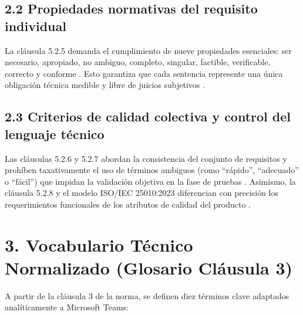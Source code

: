 \documentclass[11pt,a4paper]{article}
\begin{document}
	\subsection*{\textbf{2.2 Propiedades normativas del requisito individual}}
	La cláusula 5.2.5 demanda el cumplimiento de nueve propiedades esenciales: ser necesario, apropiado, no ambiguo, completo, singular, factible, verificable, correcto y conforme \cite{iso29148_2018}. Esto garantiza que cada sentencia represente una única obligación técnica medible y libre de juicios subjetivos \cite{swebok2024}.
	
	\subsection*{\textbf{2.3 Criterios de calidad colectiva y control del lenguaje técnico}}
	Las cláusulas 5.2.6 y 5.2.7 abordan la consistencia del conjunto de requisitos y prohíben taxativamente el uso de términos ambiguos (como ``rápido'', ``adecuado'' o ``fácil'') que impidan la validación objetiva en la fase de pruebas \cite{iso29148_2018}. Asimismo, la cláusula 5.2.8 y el modelo ISO/IEC 25010:2023 diferencian con precisión los requerimientos funcionales de los atributos de calidad del producto \cite{iso25010_2023, pressman2020}.
	
	\section*{\textbf{3. Vocabulario Técnico Normalizado (Glosario Cláusula 3)}}
	A partir de la cláusula 3 de la norma, se definen diez términos clave adaptados analíticamente a Microsoft Teams:
	
\end{document}
